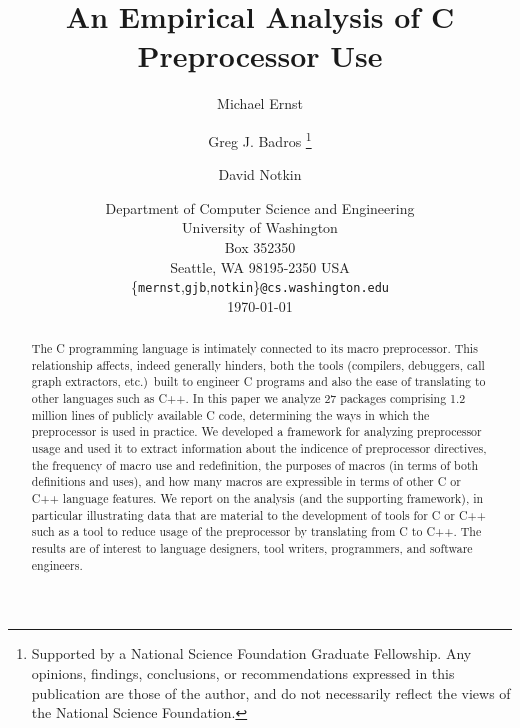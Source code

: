 \documentclass[11pt]{article}
\def\numpackages{27}
\def\numlines{1.2 million}
\begin{document}
% 


\title{An Empirical Analysis of C Preprocessor Use}

\author{Michael Ernst%
  \and Greg J. Badros%
  \thanks{Supported by a National Science Foundation
    Graduate Fellowship. Any opinions, findings, conclusions, or
    recommendations expressed in this publication are those of the
    author, and do not necessarily reflect the views of the National
    Science Foundation.}
  \and David Notkin}

\date{Department of Computer Science and Engineering \\
University of Washington \\
Box 352350 \\
Seattle, WA  98195-2350  USA \\
{\small \{{\tt mernst},{\tt gjb},{\tt notkin}\}{\tt @cs.washington.edu}} \\
\today}  

\maketitle

\begin{abstract}

  The C programming language is intimately connected to its macro
  preprocessor.  This relationship affects, indeed generally hinders, both
  the tools (compilers, debuggers, call graph extractors, etc.)\ built to
  engineer C programs and also the ease of translating to other languages
  such as C++.  In this paper we analyze {\numpackages} packages comprising
  {\numlines} lines of publicly available C code, determining the ways in
  which the preprocessor is used in practice.  We developed a framework for
  analyzing preprocessor usage and used it to extract information about the
  indicence of preprocessor directives, the frequency of macro use and
  redefinition, the purposes of macros (in terms of both definitions and
  uses), and how many macros are expressible in terms of other C or C++
  language features.  We report on the analysis (and the supporting
  framework), in particular illustrating data that are material to the
  development of tools for C or C++ such as a tool to reduce usage of the
  preprocessor by translating from C to C++.  The results are of interest
  to language designers, tool writers, programmers, and software engineers.
\end{abstract}
\end{document}

